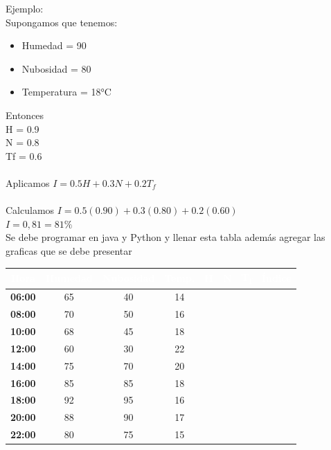 \documentclass[11pt,a4paper]{article}
\renewcommand{\arraystretch}{1.08}
\begin{document}
Ejemplo: \\
Supongamos que tenemos: \\
\begin{itemize}
    \item Humedad = 90%
    \item Nubosidad = 80%
    \item Temperatura = 18°C
\end{itemize}
Entonces \\
H = 0.9 \\
N = 0.8 \\
Tf = 0.6 \\
\\
Aplicamos $I=0.5H+0.3N+0.2T_f$ \\
\\
Calculamos $I=0.5(0.90)+0.3(0.80)+0.2(0.60)$ \\
$I = 0,81 = 81\%$ \\
Se debe programar en java y Python y llenar esta tabla además agregar las
graficas que se debe presentar \\
\begin{table}[h!]
\centering
{}
\setlength{\arrayrulewidth}{0.75pt}
\renewcommand{\arraystretch}{1.25}
\begin{tabular}{|c|c|c|c|c|c|c|c|}
\hline
\rowcolor{headerblue}
\textbf{\textcolor{white}{Hora}} & \textbf{\textcolor{white}{Humedad}} & \textbf{\textcolor{white}{Nubosidad}} & \textbf{\textcolor{white}{Temp.}} & \textbf{\textcolor{white}{H}} & \textbf{\textcolor{white}{N}} & \textbf{\textcolor{white}{T\textsubscript{f}}} & \textbf{\textcolor{white}{Índice}} \\ \hline
\rowcolor{rowlight}
\textbf{06:00} & 65 & 40 & 14 & & & & \\ \hline
\textbf{08:00} & 70 & 50 & 16 & & & & \\ \hline
\rowcolor{rowlight}
\textbf{10:00} & 68 & 45 & 18 & & & & \\ \hline
\textbf{12:00} & 60 & 30 & 22 & & & & \\ \hline
\rowcolor{rowlight}
\textbf{14:00} & 75 & 70 & 20 & & & & \\ \hline
\textbf{16:00} & 85 & 85 & 18 & & & & \\ \hline
\rowcolor{rowlight}
\textbf{18:00} & 92 & 95 & 16 & & & & \\ \hline
\textbf{20:00} & 88 & 90 & 17 & & & & \\ \hline
\rowcolor{rowlight}
\textbf{22:00} & 80 & 75 & 15 & & & & \\ \hline
\end{tabular}
\end{table}
\end{document}
